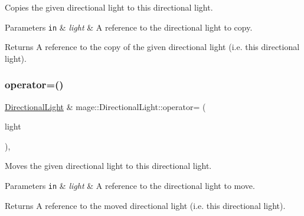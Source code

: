 Copies the given directional light to this directional light.


\begin{DoxyParams}[1]{Parameters}
\mbox{\tt in}  & {\em light} & A reference to the directional light to copy. \\
\hline
\end{DoxyParams}
\begin{DoxyReturn}{Returns}
A reference to the copy of the given directional light (i.\+e. this directional light). 
\end{DoxyReturn}
\hypertarget{classmage_1_1_directional_light_a6affb7a9c6e9a509a2c80944d99b3506}{}\label{classmage_1_1_directional_light_a6affb7a9c6e9a509a2c80944d99b3506} 
\subsubsection{\texorpdfstring{operator=()}{operator=()}\hspace{0.1cm}{\footnotesize\ttfamily [2/2]}}
{\footnotesize\ttfamily \hyperlink{classmage_1_1_directional_light}{Directional\+Light} \& mage\+::\+Directional\+Light\+::operator= (\begin{DoxyParamCaption}\item[{\hyperlink{classmage_1_1_directional_light}{Directional\+Light} \&\&}]{light }\end{DoxyParamCaption})\hspace{0.3cm}{\ttfamily [default]}, {\ttfamily [noexcept]}}

Moves the given directional light to this directional light.


\begin{DoxyParams}[1]{Parameters}
\mbox{\tt in}  & {\em light} & A reference to the directional light to move. \\
\hline
\end{DoxyParams}
\begin{DoxyReturn}{Returns}
A reference to the moved directional light (i.\+e. this directional light). 
\end{DoxyReturn}
\hypertarget{classmage_1_1_directional_light_ac8b63948d393696ca8745c799328be84}{}\label{classmage_1_1_directional_light_ac8b63948d393696ca8745c799328be84} 
